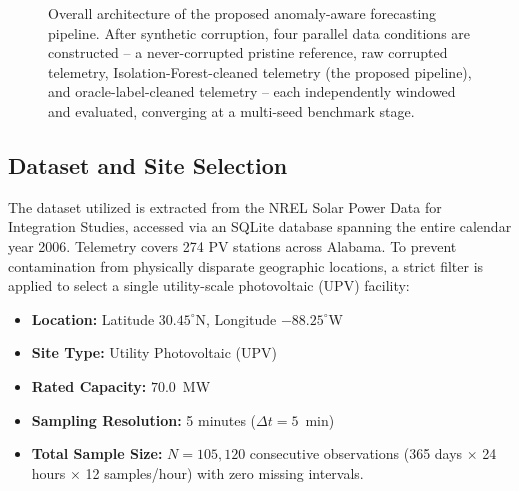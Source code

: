 \documentclass[conference]{IEEEtran}
\begin{document}
\begin{figure}[t]
{%
}
\caption{Overall architecture of the proposed anomaly-aware forecasting pipeline. After synthetic corruption, four parallel data conditions are constructed -- a never-corrupted pristine reference, raw corrupted telemetry, Isolation-Forest-cleaned telemetry (the proposed pipeline), and oracle-label-cleaned telemetry -- each independently windowed and evaluated, converging at a multi-seed benchmark stage.}
\label{fig:architecture}
\end{figure}

\subsection{Dataset and Site Selection}
The dataset utilized is extracted from the NREL Solar Power Data for Integration Studies, accessed via an SQLite database spanning the entire calendar year 2006. Telemetry covers 274 PV stations across Alabama. To prevent contamination from physically disparate geographic locations, a strict filter is applied to select a single utility-scale photovoltaic (UPV) facility:
\begin{itemize}
    \item \textbf{Location:} Latitude $30.45^\circ$N, Longitude $-88.25^\circ$W
    \item \textbf{Site Type:} Utility Photovoltaic (UPV)
    \item \textbf{Rated Capacity:} $70.0$~MW
    \item \textbf{Sampling Resolution:} 5 minutes ($\Delta t = 5$~min)
    \item \textbf{Total Sample Size:} $N = 105{,}120$ consecutive observations (365 days $\times$ 24 hours $\times$ 12 samples/hour) with zero missing intervals.
\end{itemize}
\end{document}

